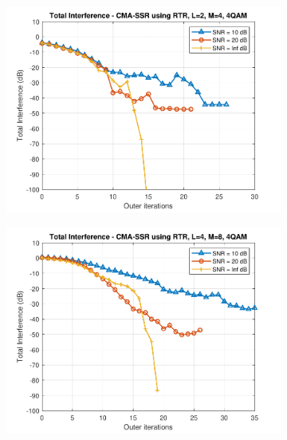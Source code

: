\begin{figure}
	\centering
	\begin{subfigure}[b]{0.45\textwidth}
		\includegraphics[width=\linewidth]{./figs/BF_RTR_TI_4QAM_L=2_M=4_K=1000.pdf}
		\label{fig:rtr_ti4_24}
	\end{subfigure}
	\begin{subfigure}[b]{0.45\textwidth}
		\includegraphics[width=\linewidth]{./figs/BF_RTR_TI_4QAM_L=4_M=8_K=1000.pdf}
		\label{fig:rtr_ti4_48}
	\end{subfigure}\\
	\begin{subfigure}[b]{0.45\textwidth}

\end{subfigure}
\end{figure}
